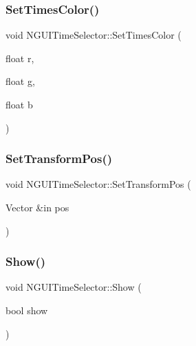 \hypertarget{class_n_g_u_i_time_selector_a976f5e92f2f80aa5365c52f37143bd4a}{}\label{class_n_g_u_i_time_selector_a976f5e92f2f80aa5365c52f37143bd4a} 
\subsubsection{\texorpdfstring{Set\+Times\+Color()}{SetTimesColor()}}
{\footnotesize\ttfamily void N\+G\+U\+I\+Time\+Selector\+::\+Set\+Times\+Color (\begin{DoxyParamCaption}\item[{float}]{r,  }\item[{float}]{g,  }\item[{float}]{b }\end{DoxyParamCaption})}

\hypertarget{class_n_g_u_i_time_selector_aba6686924ec86b0ed154908292616674}{}\label{class_n_g_u_i_time_selector_aba6686924ec86b0ed154908292616674} 
\subsubsection{\texorpdfstring{Set\+Transform\+Pos()}{SetTransformPos()}}
{\footnotesize\ttfamily void N\+G\+U\+I\+Time\+Selector\+::\+Set\+Transform\+Pos (\begin{DoxyParamCaption}\item[{Vector \&in}]{pos }\end{DoxyParamCaption})}

\hypertarget{class_n_g_u_i_time_selector_a0a6ad7fef6a012d8bf2fbdbe91044d77}{}\label{class_n_g_u_i_time_selector_a0a6ad7fef6a012d8bf2fbdbe91044d77} 
\subsubsection{\texorpdfstring{Show()}{Show()}}
{\footnotesize\ttfamily void N\+G\+U\+I\+Time\+Selector\+::\+Show (\begin{DoxyParamCaption}\item[{bool}]{show }\end{DoxyParamCaption})}



